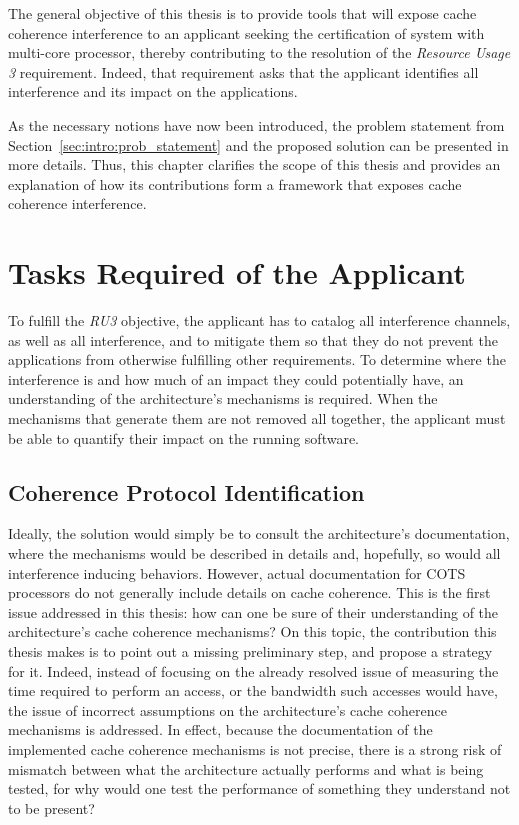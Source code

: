 The general objective of this thesis is to provide tools that will expose cache
coherence interference to an applicant seeking the certification of system with
multi-core processor, thereby contributing to the resolution of the
\textit{Resource Usage 3} requirement. Indeed, that requirement asks that the
applicant identifies all interference and its impact on the applications.

As the necessary notions have now been introduced, the problem statement from
Section~\ref{sec:intro:prob_statement} and the proposed solution can be
presented in more details. Thus, this chapter clarifies the scope of this
thesis and provides an explanation of how its contributions form a framework
that exposes cache coherence interference.

\stopallthesefloats
\section{Tasks Required of the Applicant}
To fulfill the \textit{RU3} objective, the applicant has to catalog all
interference channels, as well as all interference, and to mitigate them so that
they do not prevent the applications from otherwise fulfilling other
requirements. To determine where the interference is and how much of an impact
they could potentially have, an understanding of the architecture's mechanisms
is required. When the mechanisms that generate them are not removed all
together, the applicant must be able to quantify their impact on the running
software.

\subsection{Coherence Protocol Identification}
\label{aaa:identification}
Ideally, the solution would simply be to consult the architecture's
documentation, where the mechanisms would be described in details and,
hopefully, so would all interference inducing behaviors. However, actual
documentation for COTS processors do not generally include details on cache
coherence. This is the first issue addressed in this thesis: how can one be sure
of their understanding of the architecture's cache coherence mechanisms?
On this topic, the contribution this thesis makes is to point out a missing
preliminary step, and propose a strategy for it. Indeed, instead of focusing on
the already resolved issue of measuring the time required to perform an access,
or the bandwidth such accesses would have, the issue of incorrect assumptions on
the architecture's cache coherence mechanisms is addressed. In effect, because
the documentation of the implemented cache coherence mechanisms is not precise,
there is a strong risk of mismatch between what the architecture actually
performs and what is being tested, for why would one test the performance of
something they understand not to be present?

